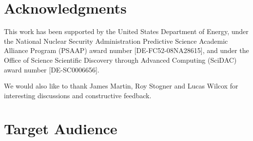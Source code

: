 \section*{Acknowledgments}

This work has been supported by the United States Department of Energy,
under the National Nuclear Security Administration Predictive Science Academic Alliance Program (PSAAP) award number [DE-FC52-08NA28615], and
under the Office of Science Scientific Discovery through Advanced Computing (SciDAC) award number [DE-SC0006656].


We would also like to thank
James Martin,
Roy Stogner and
Lucas Wilcox
for interesting discussions and constructive feedback.

% 
% 
\section*{Target Audience}


